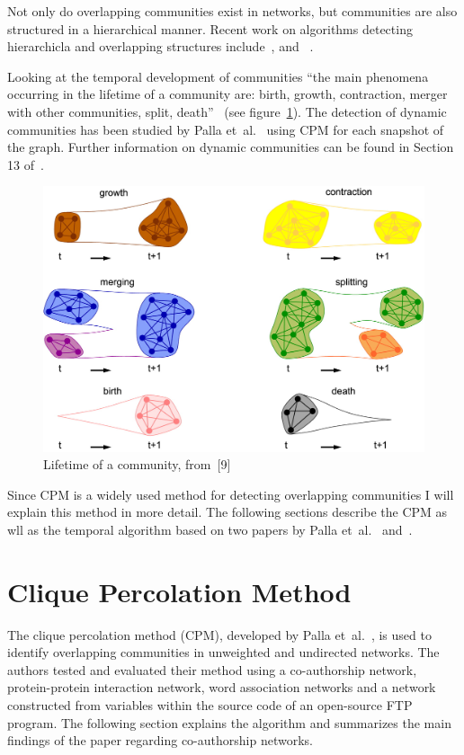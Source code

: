 \documentclass[runningheads,a4paper]{llncs}
\begin{document}
Not only do overlapping communities exist in networks, but communities are also structured in a hierarchical manner.
Recent work on algorithms detecting hierarchicla and overlapping structures  include~\cite{1367-2630-11-3-033015}, \cite{Cui201485} and~ \cite{Shen20091706}.

Looking at the temporal development of communities ``the main phenomena occurring in the lifetime of a community are: birth, growth, contraction, merger with other communities, split, death''~\cite{fortunato2010community} (see figure~\ref{fig:evolution}).
The detection of dynamic communities has been studied by Palla et~al.~\cite{palla2007quantifying} using CPM for each snapshot of the graph. Further information on dynamic communities can be found in Section 13 of~\cite{fortunato2010community}.

\begin{figure}
	\includegraphics[width=\textwidth]{img/fullSizeEvolution.jpg}
	\caption{Lifetime of a community, from~[9]}
	\label{fig:evolution}
\end{figure}

Since CPM is a widely used method for detecting overlapping communities I will explain this method in more detail. The following sections describe the CPM as wll as the temporal algorithm based on two papers by Palla et~al.~\cite{palla2005uncovering} and~\cite{palla2007quantifying}.

\section{Clique Percolation Method}
\label{cpm}
The clique percolation method (CPM), developed by Palla et~al.~\cite{palla2007quantifying}, is used to identify overlapping communities in unweighted and undirected networks.
The authors tested and evaluated their method using a co-authorship network, protein-protein interaction network, word association networks and a network constructed from variables within the source code of an open-source FTP program.
The following section explains the algorithm and summarizes the main findings of the paper regarding co-authorship networks.
\end{document}
